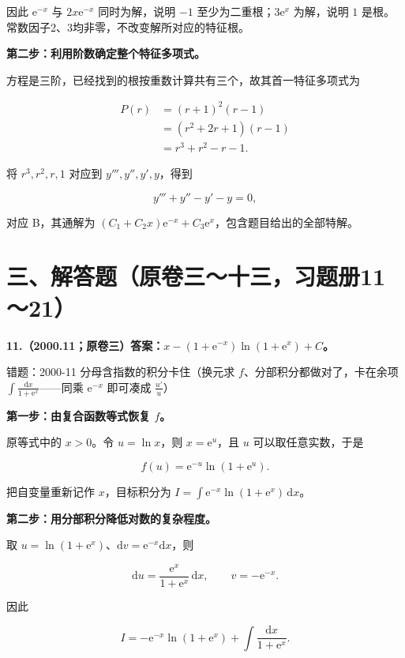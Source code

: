 \documentclass[UTF8,11pt,fontset=windows]{ctexart}
\begin{document}
因此 $\mathrm e^{-x}$ 与 $2x\mathrm e^{-x}$ 同时为解，说明 $-1$ 至少为二重根；$3\mathrm e^x$ 为解，说明 $1$ 是根。常数因子2、3均非零，不改变解所对应的特征根。

\textbf{第二步：利用阶数确定整个特征多项式。}

方程是三阶，已经找到的根按重数计算共有三个，故其首一特征多项式为

$$
\begin{aligned}
P(r)&=(r+1)^2(r-1)\\
&=(r^2+2r+1)(r-1)\\
&=r^3+r^2-r-1.
\end{aligned}
$$

将 $r^3,r^2,r,1$ 对应到 $y''',y'',y',y$，得到

$$
\boxed{y'''+y''-y'-y=0,}
$$

对应 B，其通解为 $(C_1+C_2x)\mathrm e^{-x}+C_3\mathrm e^x$，包含题目给出的全部特解。

\clearpage

\section*{三、解答题（原卷三～十三，习题册11～21）}

\textbf{11.（2000.11；原卷三）答案：$x-(1+\mathrm e^{-x})\ln(1+\mathrm e^x)+C$。}

\begingroup\color{gray}错题：2000-11 分母含指数的积分卡住（换元求 $f$、分部积分都做对了，卡在余项 $\int\frac{\mathrm dx}{1+\mathrm e^{x}}$——同乘 $\mathrm e^{-x}$ 即可凑成 $\frac{u'}{u}$）\par\endgroup

\textbf{第一步：由复合函数等式恢复 $f$。}

原等式中的 $x>0$。令 $u=\ln x$，则 $x=\mathrm e^u$，且 $u$ 可以取任意实数，于是

$$
f(u)=\mathrm e^{-u}\ln(1+\mathrm e^u).
$$

把自变量重新记作 $x$，目标积分为 $I=\int\mathrm e^{-x}\ln(1+\mathrm e^x)\,\mathrm dx$。

\textbf{第二步：用分部积分降低对数的复杂程度。}

取 $u=\ln(1+\mathrm e^x)$、$\mathrm dv=\mathrm e^{-x}\mathrm dx$，则

$$
\mathrm du=\frac{\mathrm e^x}{1+\mathrm e^x}\,\mathrm dx,
\qquad v=-\mathrm e^{-x}.
$$

因此

$$
I=-\mathrm e^{-x}\ln(1+\mathrm e^x)
 +\int\frac{\mathrm dx}{1+\mathrm e^x}.
$$
\end{document}
